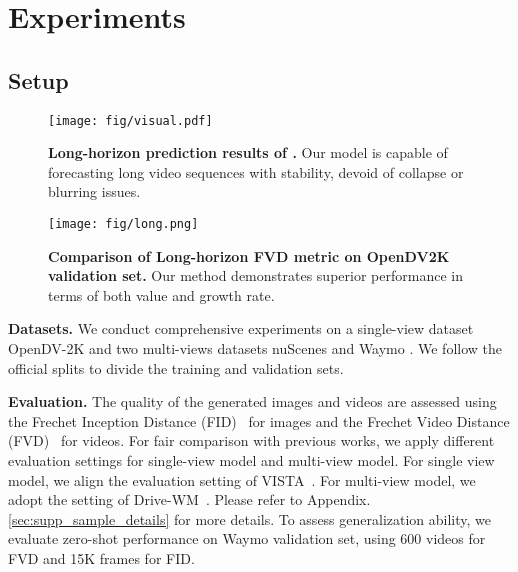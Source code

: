 \section{Experiments}
\subsection{Setup}


\begin{figure*}[t]
  \centering
   \texttt{[image: fig/visual.pdf]}
   \caption{\textbf{Long-horizon prediction results of \ourmethod.}  Our model is capable of forecasting long video sequences with stability, devoid of collapse or blurring issues.}
   \label{fig:visual}
\end{figure*}
\begin{figure}[h]
  \centering
   \texttt{[image: fig/long.png]}
   \caption{\textbf{Comparison of Long-horizon FVD metric on OpenDV2K validation set.} Our method demonstrates superior performance in terms of both value and growth rate.}
   \label{fig:long}
\end{figure}
\textbf{Datasets.} We conduct comprehensive experiments on a single-view dataset OpenDV-2K \cite{genad} and two multi-views datasets nuScenes \cite{caesar2020nuscenes} and Waymo \cite{waymo}. We follow the official splits to divide the training and validation sets.

\noindent \textbf{Evaluation.}
The quality of the generated images and videos are assessed using the Frechet Inception Distance (FID)~\cite{fid} for images and the Frechet Video Distance (FVD)~\cite{fvd} for videos. For fair comparison with previous works, we apply different evaluation settings for single-view model and multi-view model. For single view model, we align the evaluation setting of VISTA~\cite{vista}.
For multi-view model, we adopt the setting of Drive-WM~\cite{drive-wm}. Please refer to Appendix.\ref{sec:supp_sample_details} for more details.
To assess generalization ability, we evaluate zero-shot performance on Waymo validation set, using 600 videos for FVD and 15K frames for FID. 

